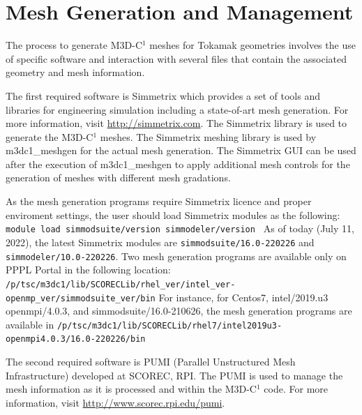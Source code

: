 \section{Mesh Generation and Management}

The process to generate M3D-C$^{1}$ meshes for Tokamak geometries involves the use of specific software and interaction with several files that contain the associated geometry and mesh information.

The first required software is Simmetrix which provides a set of tools and libraries for engineering simulation including a state-of-art mesh generation. For more information, visit \href{http://simmetrix.com}{http://simmetrix.com}. The Simmetrix library is used to generate the M3D-C$^{1}$ meshes. The Simmetrix meshing library is used by m3dc1\_meshgen for the actual mesh generation. The Simmetrix GUI can be used after the execution of m3dc1\_meshgen to apply additional mesh controls for the generation of meshes with different mesh gradations. 

As the mesh generation programs require Simmetrix licence and proper enviroment settings, the user should load Simmetrix modules as the following:
\newline\newline
\texttt{
module load simmodsuite/version simmodeler/version
}
\newline\newline
As of today (July 11, 2022), the latest Simmetrix modules are \texttt{simmodsuite/16.0-220226} and \texttt{simmodeler/10.0-220226}.
\newline\newline
Two mesh generation programs are available only on PPPL Portal in the following location:
\newline\newline
\texttt{/p/tsc/m3dc1/lib/SCORECLib/rhel\_ver/intel\_ver-openmp\_ver/simmodsuite\_ver/bin}
\newline\newline
For instance, for Centos7, intel/2019.u3 openmpi/4.0.3, and simmodsuite/16.0-210626, the mesh generation programs are available in
\newline\newline
\texttt{/p/tsc/m3dc1/lib/SCORECLib/rhel7/intel2019u3-openmpi4.0.3/16.0-220226/bin}

The second required software is PUMI (Parallel Unstructured Mesh Infrastructure) developed at SCOREC, RPI. The PUMI is used to manage the mesh information as it is processed and within the M3D-C$^{1}$ code. For more information, visit \href{http://www.scorec.rpi.edu/pumi}{http://www.scorec.rpi.edu/pumi}. 

